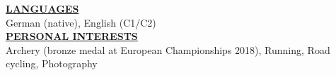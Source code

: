 \documentclass{article}
\begin{document}
\vspace{0.3cm}
\noindent \textbf{\underline{LANGUAGES}} \\

German (native), English (C1/C2)
\vspace{0.3cm} \\




\noindent \textbf{\underline{PERSONAL INTERESTS}} \\

Archery (bronze medal at European Championships 2018), Running, Road cycling, Photography
\end{document}
